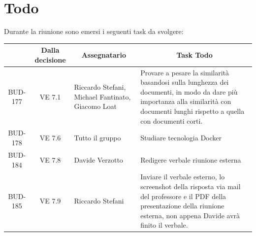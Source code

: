

\section{Todo}

Durante la riunione sono emersi i seguenti task da svolgere:

\vspace{0.5cm}

\begin{table}[htbp]
\centering
{}
\begin{tabular}{|c|c|p{}|p{}|}
    \hline
    \rowcolor[gray]{0.75}
    \multicolumn{1}{|c|}{\textbf{Codice}} & \multicolumn{1}{|c|}{\textbf{Dalla decisione}} & \multicolumn{1}{|c|}{\textbf{Assegnatario}} & \multicolumn{1}{|c|}{\textbf{Task Todo}} \\
    \hline
    BUD-177 & VE 7.1 & Riccardo Stefani, Michael Fantinato, Giacomo Loat & Provare a pesare la similarità basandosi sulla lunghezza dei documenti, in modo da dare più importanza alla similarità con documenti lunghi rispetto a quella con documenti corti. \\
    BUD-178 & VE 7.6 & Tutto il gruppo & Studiare tecnologia Docker \\
    BUD-184 & VE 7.8 & Davide Verzotto & Redigere verbale riunione esterna \\
    BUD-185 & VE 7.9 & Riccardo Stefani & Inviare il verbale esterno, lo screenshot della risposta via mail del professore e il PDF della presentazione della riunione esterna, non appena Davide avrà finito il verbale. \\
    \hline
\end{tabular}
\end{table}

